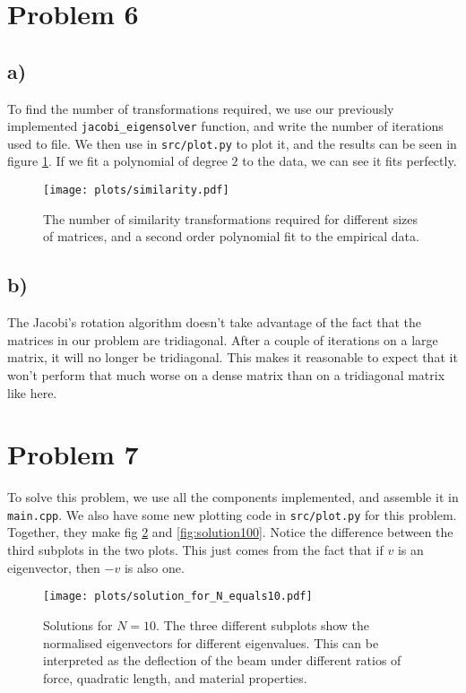 \documentclass[english,notitlepage]{revtex4-1}  %
\begin{document}
\section*{Problem 6}
\subsection*{a)}
To find the number of transformations required, we use our previously implemented \lstinline{jacobi_eigensolver} function, and write the number of iterations used to file. We then use in \lstinline{src/plot.py} to plot it, and the results can be seen in figure \ref{fig:similarity}. If we fit a polynomial of degree $2$ to the data, we can see it fits perfectly.

\begin{figure}
    \centering
    \texttt{[image: plots/similarity.pdf]}
    \caption{The number of similarity transformations required for different sizes of matrices, and a second order polynomial fit to the empirical data.}
    \label{fig:similarity}
\end{figure}

\subsection*{b)}
The Jacobi's rotation algorithm doesn't take advantage of the fact that the matrices in our problem are tridiagonal. After a couple of iterations on a large matrix, it will no longer be tridiagonal. This makes it reasonable to expect that it won't perform that much worse on a dense matrix than on a tridiagonal matrix like here.

\section*{Problem 7}
To solve this problem, we use all the components implemented, and assemble it in \lstinline{main.cpp}. We also have some new plotting code in \lstinline{src/plot.py} for this problem. Together, they make fig \ref{fig:solution10} and \ref{fig:solution100}. Notice the difference between the third subplots in the two plots. This just comes from the fact that if $v$ is an eigenvector, then $-v$ is also one.

\begin{figure}
    \centering
    \texttt{[image: plots/solution\_for\_N\_equals10.pdf]}
    \caption{Solutions for $N = 10$. The three different subplots show the normalised eigenvectors for different eigenvalues. This can be interpreted as the deflection of the beam under different ratios of force, quadratic length, and material properties.}
    \label{fig:solution10}
\end{figure}
\end{document}
